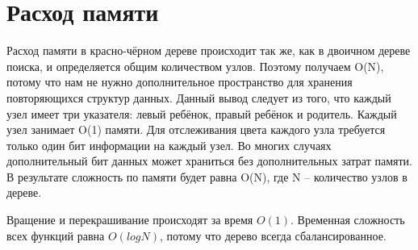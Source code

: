 \documentclass[otchet]{SCWorks}
\begin{document}
\section{Расход памяти}
Расход памяти в красно-чёрном дереве происходит так же, как в двоичном дереве поиска, и определяется общим количеством узлов. Поэтому получаем O(N), потому что нам не нужно дополнительное пространство для хранения повторяющихся структур данных. Данный вывод следует из того, что каждый узел имеет три указателя: левый ребёнок, правый ребёнок и родитель. Каждый узел занимает O(1) памяти. Для отслеживания цвета каждого узла требуется только один бит информации на каждый узел. Во многих случаях дополнительный бит данных может храниться без дополнительных затрат памяти. В результате сложность по памяти будет равна O(N), где N – количество узлов в дереве.

Вращение и перекрашивание происходят за время $O(1)$. Временная сложность всех функций равна $O(logN)$, потому что дерево всегда сбалансированное.


	


\appendix
\end{document}
